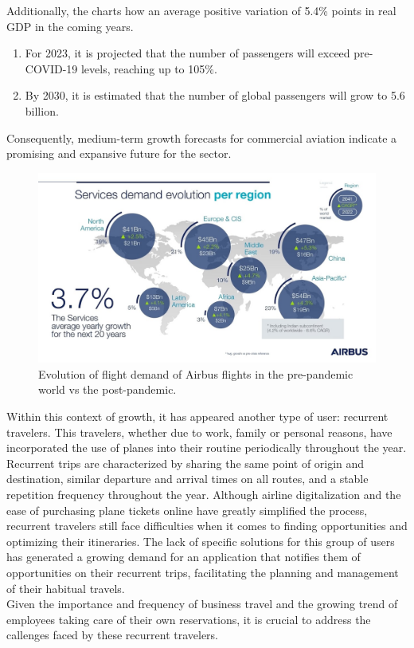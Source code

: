 \documentclass[../memory.tex]{subfiles}
\begin{document}
Additionally, the charts how an average positive variation of 5.4\% points in
real GDP in the coming years.
\begin{enumerate}[label = -]
	\item For 2023, it is projected that the number of passengers will exceed
	      pre-COVID-19 levels, reaching up to 105\%.
	\item By 2030, it is estimated that the number of global passengers will grow
	      to 5.6 billion.
\end{enumerate}
Consequently, medium-term growth forecasts for commercial aviation indicate a
promising and expansive future for the sector.
\begin{figure}[H]
	\centering
	\includegraphics[width=\textwidth]{./assets/airbus-service-demand.png}
	\caption{Evolution of flight demand of Airbus flights in the pre-pandemic
		world vs the post-pandemic.}
\end{figure}
Within this context of growth, it has appeared another type of user: recurrent
travelers. This travelers, whether due to work, family or personal reasons,
have incorporated the use of planes into their routine periodically throughout
the year.
\\[8pt]
Recurrent trips are characterized by sharing the same point of origin and
destination, similar departure and arrival times on all routes, and a stable
repetition frequency throughout the year. Although airline digitalization and
the ease of purchasing plane tickets online have greatly simplified the process,
recurrent travelers still face difficulties when it comes to finding
opportunities and optimizing their itineraries. The lack of specific solutions
for this group of users has generated a growing demand for an application that
notifies them of opportunities on their recurrent trips, facilitating the
planning and management of their habitual travels.
\\[8pt]
Given the importance and frequency of business travel and the growing trend of
employees taking care of their own reservations, it is crucial to address the
callenges faced by these recurrent travelers.
\end{document}
